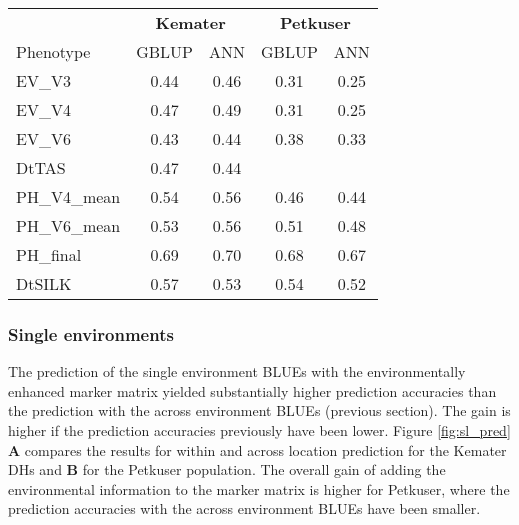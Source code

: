 \onehalfspacing
\begin{table}[H]
\centering
\begin{tabular}{lcc|cc}
  \toprule
  & \multicolumn{2}{c}{\textbf{Kemater}} & \multicolumn{2}{c}{\textbf{Petkuser}} \\
  Phenotype    & GBLUP                                & ANN  & GBLUP & ANN                    \\ 
  \midrule
  EV\_V3       & 0.44                                 & 0.46 & 0.31  & 0.25                   \\ 
  EV\_V4       & 0.47                                 & 0.49 & 0.31  & 0.25                   \\ 
  EV\_V6       & 0.43                                 & 0.44 & 0.38  & 0.33                   \\ 
  DtTAS        & 0.47                                 & 0.44 &       &                        \\ 
  PH\_V4\_mean & 0.54                                 & 0.56 & 0.46  & 0.44                   \\ 
  PH\_V6\_mean & 0.53                                 & 0.56 & 0.51  & 0.48                   \\ 
  PH\_final    & 0.69                                 & 0.70 & 0.68  & 0.67                   \\ 
  DtSILK       & 0.57                                 & 0.53 & 0.54  & 0.52                   \\ 
  \bottomrule
\end{tabular}
\end{table}
\doublespacing

\subsubsection{Single environments}

The prediction of the single environment BLUEs with the environmentally enhanced marker
matrix yielded substantially higher prediction accuracies than the prediction with the
across environment BLUEs (previous section). The gain is higher if the prediction
accuracies previously have been lower. Figure \ref{fig:sl_pred} \textbf{A} compares the
results for within and across location prediction for the Kemater DHs and \textbf{B} for
the Petkuser population. The overall gain of adding the environmental information to the
marker matrix is higher for Petkuser, where the prediction accuracies with the across
environment BLUEs have been smaller.

